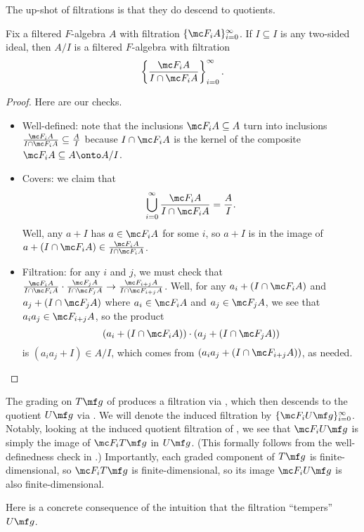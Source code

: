 \documentclass[../notes.tex]{subfiles}
\begin{document}
The up-shot of filtrations is that they do descend to quotients.
\begin{lemma} \label{lem:quotient-filtration}
	Fix a filtered $F$-algebra $A$ with filtration $\{\mc F_iA\}_{i=0}^\infty$. If $I\subseteq I$ is any two-sided ideal, then $A/I$ is a filtered $F$-algebra with filtration
	\[\left\{\frac{\mc F_iA}{I\cap\mc F_iA}\right\}_{i=0}^\infty.\]
\end{lemma}
\begin{proof}
	Here are our checks.
	\begin{itemize}
		\item Well-defined: note that the inclusions $\mc F_iA\subseteq A$ turn into inclusions $\frac{\mc F_iA}{I\cap\mc F_iA}\subseteq\frac AI$ because $I\cap\mc F_iA$ is the kernel of the composite $\mc F_iA\subseteq A\onto A/I$.
		\item Covers: we claim that
		\[\bigcup_{i=0}^\infty\frac{\mc F_iA}{I\cap\mc F_iA}=\frac AI.\]
		Well, any $a+I$ has $a\in\mc F_iA$ for some $i$, so $a+I$ is in the image of $a+(I\cap\mc F_iA)\in\frac{\mc F_iA}{I\cap\mc F_iA}$.
		\item Filtration: for any $i$ and $j$, we must check that $\frac{\mc F_iA}{I\cap\mc F_iA}\cdot\frac{\mc F_jA}{I\cap\mc F_jA}\to\frac{\mc F_{i+j}A}{I\cap\mc F_{i+j}A}$. Well, for any $a_i+(I\cap\mc F_iA)$ and $a_j+(I\cap\mc F_jA)$ where $a_i\in\mc F_iA$ and $a_j\in\mc F_jA$, we see that $a_ia_j\in\mc F_{i+j}A$, so the product
		\[(a_i+(I\cap\mc F_iA))\cdot(a_j+(I\cap\mc F_jA))\]
		is $(a_ia_j+I)\in A/I$, which comes from $(a_ia_j+(I\cap\mc F_{i+j}A))$, as needed.
		\qedhere
	\end{itemize}
\end{proof}
\begin{example} \label{ex:filter-ug}
	The grading on $T\mf g$ of  produces a filtration via , which then descends to the quotient $U\mf g$ via . We will denote the induced filtration by $\{\mc F_iU\mf g\}_{i=0}^\infty$. Notably, looking at the induced quotient filtration of , we see that $\mc F_iU\mf g$ is simply the image of $\mc F_iT\mf g$ in $U\mf g$. (This formally follows from the well-definedness check in .) Importantly, each graded component of $T\mf g$ is finite-dimensional, so $\mc F_iT\mf g$ is finite-dimensional, so its image $\mc F_iU\mf g$ is also finite-dimensional.
\end{example}
Here is a concrete consequence of the intuition that the filtration ``tempers'' $U\mf g$.
\end{document}
